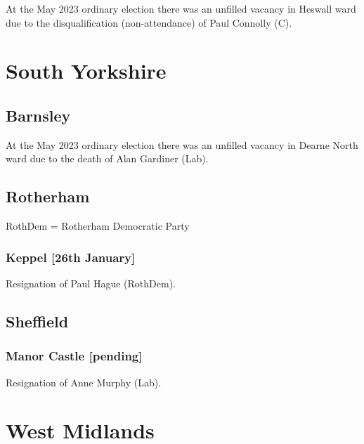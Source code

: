 \documentclass[a4paper,openany]{book}
\begin{document}
\begin{resultsiii}
At the May 2023 ordinary election there was an unfilled vacancy in Heswall ward due to the disqualification (non-attendance) of Paul Connolly (C).%

\section{South Yorkshire}

\subsection*{Barnsley}

At the May 2023 ordinary election there was an unfilled vacancy in Dearne North ward due to the death of Alan Gardiner (Lab).%

\subsection*{Rotherham}

RothDem = Rotherham Democratic Party

\subsubsection*{Keppel \hspace*{\fill}\nolinebreak[1]%
	\enspace\hspace*{\fill}
	[26th January]}


Resignation of Paul Hague (RothDem).

\subsection*{Sheffield}

\subsubsection*{Manor Castle \hspace*{\fill}\nolinebreak[1]%
	\enspace\hspace*{\fill}
	[pending]}


Resignation of Anne Murphy (Lab).

\section{West Midlands}


\end{resultsiii}
\end{document}
